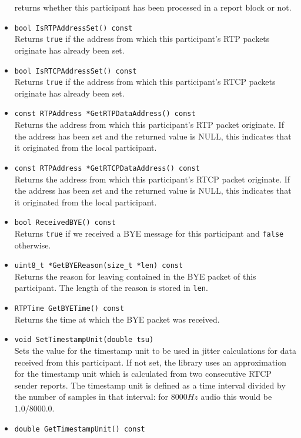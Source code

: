 \documentclass[12pt,a4paper]{article}
\begin{document}
\begin{itemize}
						returns whether this participant has been processed in a report
						block or not.
					\item {\tt bool IsRTPAddressSet() const}\\
						Returns {\tt true} if the address from which this participant's RTP packets
						originate has already been set.
					\item {\tt bool IsRTCPAddressSet() const}\\
						Returns {\tt true} if the address from which this participant's RTCP packets
						originate has already been set.
					\item {\tt const RTPAddress *GetRTPDataAddress() const}\\
						Returns the address from which this participant's RTP packet originate. If the
						address has been set and the returned value is NULL, this indicates that it
						originated from the local participant.
					\item {\tt const RTPAddress *GetRTCPDataAddress() const}\\
						Returns the address from which this participant's RTCP packet originate. If the
						address has been set and the returned value is NULL, this indicates that it
						originated from the local participant.					
					\item {\tt bool ReceivedBYE() const}\\
						Returns {\tt true} if we received a BYE message for this participant and
						{\tt false} otherwise.
					\item {\tt uint8\_t *GetBYEReason(size\_t *len) const}\\
						Returns the reason for leaving contained in the BYE packet of this participant.
						The length of the reason is stored in {\tt len}.
					\item {\tt RTPTime GetBYETime() const}\\
						Returns the time at which the BYE packet was received.
					\item {\tt void SetTimestampUnit(double tsu)}\\
						Sets the value for the timestamp unit to be used in jitter calculations
						for data received from this participant. If not set, the library uses an
						approximation for the timestamp unit which is calculated from two consecutive
						RTCP sender reports. The timestamp unit is defined as a time interval divided
						by the number of samples in that interval: for $8000 Hz$ audio this would be
						$1.0/8000.0$.
					\item {\tt double GetTimestampUnit() const}\\

\end{itemize}
\end{document}
